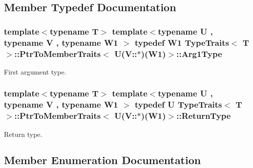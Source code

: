 \subsection{Member Typedef Documentation}
\subsubsection[{\texorpdfstring{Arg1\+Type}{Arg1Type}}]{\setlength{\rightskip}{0pt plus 5cm}template$<$typename T$>$ template$<$typename U , typename V , typename W1 $>$ typedef W1 {\bf Type\+Traits}$<$ T $>$\+::{\bf Ptr\+To\+Member\+Traits}$<$ U(V\+::$\ast$)(W1)$>$\+::{\bf Arg1\+Type}}\hypertarget{structTypeTraits_1_1PtrToMemberTraits_3_01U_07V_1_1_5_08_07W1_08_4_a07b7348f01bcc4b6bceffd73e77c19b9}{}\label{structTypeTraits_1_1PtrToMemberTraits_3_01U_07V_1_1_5_08_07W1_08_4_a07b7348f01bcc4b6bceffd73e77c19b9}
First argument type. 
\subsubsection[{\texorpdfstring{Return\+Type}{ReturnType}}]{\setlength{\rightskip}{0pt plus 5cm}template$<$typename T$>$ template$<$typename U , typename V , typename W1 $>$ typedef U {\bf Type\+Traits}$<$ T $>$\+::{\bf Ptr\+To\+Member\+Traits}$<$ U(V\+::$\ast$)(W1)$>$\+::{\bf Return\+Type}}\hypertarget{structTypeTraits_1_1PtrToMemberTraits_3_01U_07V_1_1_5_08_07W1_08_4_aa75fe26d5dff89def4817a69df3c1cc3}{}\label{structTypeTraits_1_1PtrToMemberTraits_3_01U_07V_1_1_5_08_07W1_08_4_aa75fe26d5dff89def4817a69df3c1cc3}
Return type. 

\subsection{Member Enumeration Documentation}
